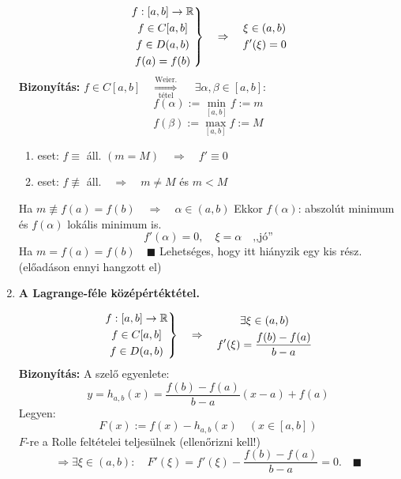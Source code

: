 \documentclass[a4paper,11.5pt]{article}
\begin{document}
\begin{enumerate}
		\[\left.\begin{gathered}
		f:[a,b]\to\mathbb{R}\\
		f\in C[a,b]\\
		f\in D(a,b)\\
		f(a)=f(b)
		\end{gathered}\right\}\quad \Rightarrow\quad \begin{gathered}
		\xi\in (a,b)\\
		f'(\xi)=0
		\end{gathered}
		\]
		\textbf{Bizonyítás:} $f\in C[a,b]\quad \overset{\text{Weier.}}{\underset{\text{tétel}}{\Longrightarrow}}\quad$
		$ \exists \alpha , \beta\in[a,b]:\quad $
		\[ f(\alpha):=\min_{[a,b]}f:=m \]
		\[ f(\beta):= \max_{[a,b]}f:=M \]
		\begin{enumerate}
			\item eset: $f\equiv$ áll. $(m=M)\quad \Rightarrow\quad f'\equiv 0$
			\item eset: $f\not\equiv$ áll.$\quad \Rightarrow\quad m\not=M$ és $ m<M$
		\end{enumerate}
		Ha $m\not\equiv f(a)=f(b)\quad \Rightarrow\quad \alpha\in(a,b)$
		Ekkor $f(\alpha)$: abszolút minimum és $f(\alpha)$ lokális minimum is.
		\[ f'(\alpha)=0,\quad \xi=\alpha\quad \text{,,jó''} \]
		Ha $m=f(a)=f(b)\quad \blacksquare$
		{\Large Lehetséges, hogy itt hiányzik egy kis rész. (előadáson ennyi hangzott el)}
		\item \textbf{A Lagrange-féle középértéktétel.}
		
		
		\[ \left.\begin{gathered}
		f:[a,b]\to\mathbb{R}\\
		f\in C[a,b]\\
		f\in D(a,b)
		\end{gathered}\right\}\quad \Rightarrow\quad \begin{gathered}
		\exists \xi\in(a,b)\\
		f'(\xi)=\frac{f(b)-f(a)}{b-a}
		\end{gathered} \]
		\textbf{Bizonyítás:} A szelő egyenlete:
		\[ y=h_{a,b}(x)=\frac{f(b)-f(a)}{b-a}(x-a)+f(a) \]
		Legyen: \[ F(x):=f(x)-h_{a,b}(x)\quad (x\in[a,b]) \]
		$F$-re a Rolle feltételei teljesülnek (ellenőrizni kell!)
		\[ \Rightarrow \exists\xi\in(a,b):\quad F'(\xi)=f'(\xi)-\frac{f(b)-f(a)}{b-a}=0.\quad \blacksquare \]
	\end{enumerate}
\end{document}
